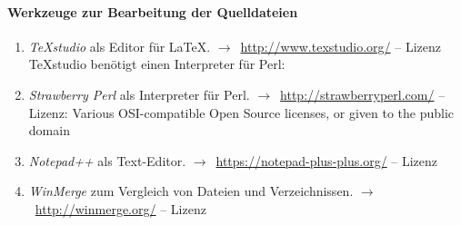 \documentclass[english,ngerman,parskip=half,headsepline,footsepline,
	fleqn,notitlepage]{scrreprt}
\newcounter{Enumi}%
\newcommand*{\tourl}[1]{$\rightarrow$~\url{#1}}
\begin{document}
	\paragraph{Werkzeuge zur Bearbeitung der Quelldateien}%

	\begin{enumerate}
		\setcounter{enumi}{\value{Enumi}}%

		\item\label{Werkzeug:TeXstudio}\emph{\TeX studio} als Editor für \LaTeX.
		\tourl{http://www.texstudio.org/}
		-- Lizenz \seename~\cite{bib:GPLii}\\
		\TeX studio benötigt einen Interpreter für Perl:

		\item\label{Werkzeug:Perl}\emph{Strawberry Perl}
		als Interpreter für Perl.
		\tourl{http://strawberryperl.com/}
		-- Lizenz:
		Various OSI-compatible Open Source licenses,
		or given to the public domain

		\item\label{Werkzeug:Notepadpp}\emph{Notepad++} als Text-Editor.
		\tourl{https://notepad-plus-plus.org/}
		-- Lizenz \seename~\cite{bib:GPLi}

		\item\label{Werkzeug:WinMerge}\emph{WinMerge}
		zum Vergleich von Dateien und Verzeichnissen.
		\tourl{http://winmerge.org/}
		-- Lizenz \seename~\cite{bib:GPLi}

		\setcounter{Enumi}{\value{enumi}}%
	\end{enumerate}
\end{document}
